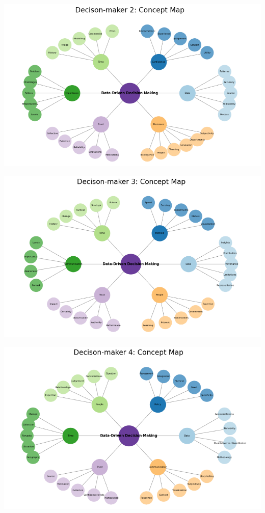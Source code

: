 \documentclass{article}
\begin{document}
\includegraphics{210431461_CSC8639_Dissertation_files/figure-latex/unnamed-chunk-5-1.pdf}

\includegraphics{210431461_CSC8639_Dissertation_files/figure-latex/unnamed-chunk-6-1.pdf}

\includegraphics{210431461_CSC8639_Dissertation_files/figure-latex/unnamed-chunk-7-1.pdf}
\end{document}
